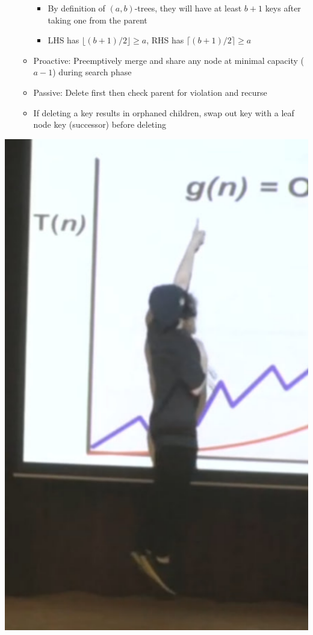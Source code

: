 \documentclass[10pt, landscape]{article}
\begin{document}
\begin{multicols*}{4}
\begin{itemize}
\begin{itemize}
\begin{itemize}
            \item By definition of $(a,b)$-trees, they will have at least $b+1$ keys after taking one from the parent
            \item LHS has $\lfloor (b+1)/2 \rfloor \geq a$, RHS has $\lceil (b+1)/2 \rceil \geq a$
        \end{itemize}
        \item Proactive: Preemptively merge and share any node at minimal capacity ($a-1$) during search phase
        \item Passive: Delete first then check parent for violation and recurse
        \item If deleting a key results in orphaned children, swap out key with a leaf node key (successor) before deleting
    \end{itemize}
\end{itemize}

\begin{center}
    \includegraphics[width=0.5\linewidth]{jump.png}    
\end{center}


\end{multicols*}
\end{document}
